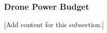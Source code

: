 
\subsubsection{Drone Power Budget}
\label{subsubsec:design_6_2_drone_power_budget}

[Add content for this subsection.]

